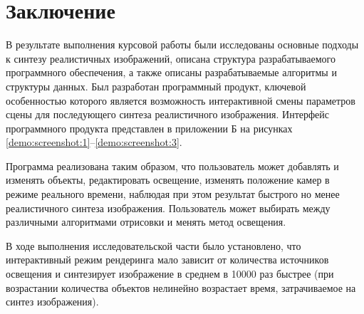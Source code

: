 \chapter*{Заключение}

В результате выполнения курсовой работы были исследованы основные подходы к синтезу реалистичных изображений, описана структура разрабатываемого программного обеспечения, а также описаны разрабатываемые алгоритмы и структуры данных. Был разработан программный продукт, ключевой особенностью которого является возможность интерактивной смены параметров сцены для последующего синтеза реалистичного изображения. Интерфейс программного продукта представлен в приложении Б на рисунках \ref{demo:screenshot:1}--\ref{demo:screenshot:3}.

Программа реализована таким образом, что пользователь может добавлять и изменять объекты, редактировать освещение, изменять положение камер в режиме реального времени, наблюдая при этом результат быстрого но менее реалистичного синтеза изображения. Пользователь может выбирать между различными алгоритмами отрисовки и менять метод освещения.

В ходе выполнения исследовательской части было установлено, что интерактивный режим рендеринга мало зависит от количества источников освещения и синтезирует изображение в среднем в 10000 раз быстрее (при возрастании количества объектов нелинейно возрастает время, затрачиваемое на синтез изображения).